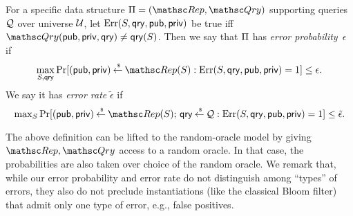 
\begin{definition} \rm
For a specific data structure $\setprim=(\Rep, \Qry)$ supporting
queries ${\cal Q}$ over universe ${\cal U}$, let
$\mathrm{Err}(S,\mathsf{qry},{\sf pub},{\sf priv})$ be  true iff
$\Qry(\pubaux,\privaux, \qry) \neq \qry(S)$.  Then we say that $\Pi$
has \emph{error probability}~$\epsilon$ if
\[\max_{S,\qry}\Pr[(\pubaux,\privaux) \getsr \Rep(S) :
\mathrm{Err}(S,\qry,\pubaux,\privaux)=1 ] \leq \epsilon.\]
%
We say it has \emph{error rate} $\tilde{\epsilon}$ if
\[{\textstyle \max_{S}\Pr[(\pubaux,\privaux) \getsr \Rep(S);\, \qry \getsr \calQ :
\mathrm{Err}(S,\qry,\pubaux,\privaux)=1]} \leq \tilde{\epsilon}. \]
\hfill\dqed
\end{definition}


The above definition can be lifted to the random-oracle model by
giving $\Rep, \Qry$ access to a random oracle. In that case, the
probabilities are also taken over choice of the random oracle. We
remark that, while our error probability and error rate do not
distinguish among ``types'' of errors, they also do not preclude
instantiations (like the classical Bloom filter) that admit only one
type of error, e.g., false positives.



